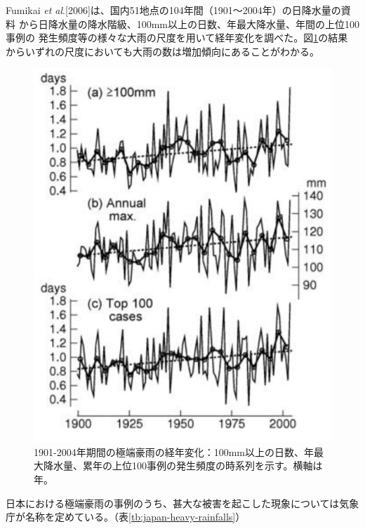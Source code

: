 Fumikai \textit{et al}.[2006]は、国内51地点の104年間（1901～2004年）の日降水量の資料
から日降水量の降水階級、100mm以上の日数、年最大降水量、年間の上位100事例の
発生頻度等の様々な大雨の尺度を用いて経年変化を調べた。図\ref{fig:fumikai-chart}の結果
からいずれの尺度においても大雨の数は増加傾向にあることがわかる。

\begin{figure}[H]
\begin{center}
\includegraphics[width=0.9\linewidth]{fig/intro/fumikai-et-al-chart1.png}
\captionsetup{width=0.9\linewidth}
\caption{1901-2004年期間の極端豪雨の経年変化：100mm以上の日数、年最大降水量、累年の上位100事例の発生頻度の時系列を示す。横軸は年。}
\label{fig:fumikai-chart}
\end{center}
\end{figure}

日本における極端豪雨の事例のうち、甚大な被害を起こした現象については気象庁が名称を定めている。（表\ref{tb:japan-heavy-rainfalls}）

